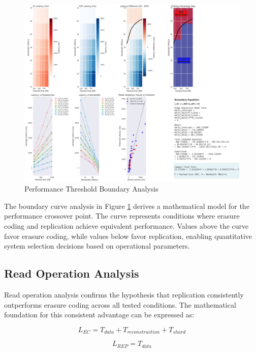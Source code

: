 \begin{figure}[ht]
\centering
\includegraphics[width=\columnwidth]{resources/chapter-4/write_bigload_avgnet_boundary.png}
\caption{Performance Threshold Boundary Analysis}
\label{fig:write-boundary}
\end{figure}

The boundary curve analysis in Figure \ref{fig:write-boundary} derives a mathematical model for the performance crossover point. The curve represents conditions where erasure coding and replication achieve equivalent performance. Values above the curve favor erasure coding, while values below favor replication, enabling quantitative system selection decisions based on operational parameters.

\subsection{Read Operation Analysis}

Read operation analysis confirms the hypothesis that replication consistently outperforms erasure coding across all tested conditions. The mathematical foundation for this consistent advantage can be expressed as:

\begin{equation}
L_{EC} = T_{data} + T_{reconstruction} + T_{shard}
\end{equation}

\begin{equation}
L_{REP} = T_{data}
\end{equation}

